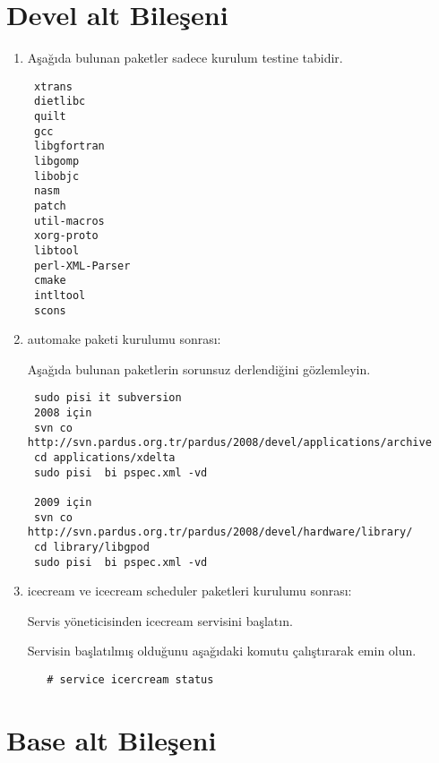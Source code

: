 \documentclass[a4paper,10pt]{article}
\begin{document}
\section{Devel alt Bileşeni}
\begin{enumerate}
 \item Aşağıda bulunan paketler sadece kurulum testine tabidir.
\begin{verbatim}
 xtrans
 dietlibc 
 quilt
 gcc
 libgfortran
 libgomp
 libobjc
 nasm
 patch
 util-macros
 xorg-proto
 libtool
 perl-XML-Parser
 cmake
 intltool
 scons
\end{verbatim}
\item automake paketi kurulumu sonrası:

Aşağıda bulunan paketlerin sorunsuz derlendiğini gözlemleyin.
\begin{verbatim}
 sudo pisi it subversion
 2008 için
 svn co http://svn.pardus.org.tr/pardus/2008/devel/applications/archive
 cd applications/xdelta
 sudo pisi  bi pspec.xml -vd

 2009 için
 svn co http://svn.pardus.org.tr/pardus/2008/devel/hardware/library/
 cd library/libgpod
 sudo pisi  bi pspec.xml -vd

\end{verbatim}

 \item icecream ve icecream scheduler paketleri kurulumu sonrası:

Servis yöneticisinden icecream servisini başlatın.

Servisin başlatılmış olduğunu aşağıdaki komutu çalıştırarak emin olun.
 \begin{verbatim}
   # service icercream status
 \end{verbatim}

\end{enumerate}


\section{Base alt Bileşeni}
\end{document}
